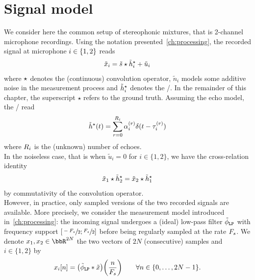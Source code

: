 \section{Signal model}
We consider here the common setup of stereophonic mixtures, that is 2-channel microphone recordings.
Using the notation presented~\cref{ch:processing}, the recorded signal at microphone $i\in\{1,2\}$ reads
\begin{equation}
    \label{eq:blaster:recordedSignal}
    \tilde{x}_i = \tilde{s} \star \tilde{h}_i^\star + \tilde{u}_i
\end{equation}
where $\star$ denotes the (continuous) convolution operator, $\tilde{n}_i$ models some additive noise in the measurement process and $\tilde{h}_i^\star$ denotes the \RIRdef/.
In the remainder of this chapter, the superscript $\star$ refers to the ground truth.
Assuming the echo model, the \RIRs/ read
\begin{equation}
    \label{eq:blaster:def_filter_star}
    \tilde{h}^\star(t) = \sum_{r=0}^{R_i} \alpha_i^{(r)} \delta(t - \tau_i^{(r)})
\end{equation}
where $R_i$ is the (unknown) number of echoes.
\\In the noiseless case, that is when $\tilde{u}_i = 0$ for $i\in\{1,2\}$, we have the cross-relation identity
\begin{equation} \label{eq:blaster:cross-relation}
    \tilde{x}_1 \star \tilde{h}_2^\star = \tilde{x}_2 \star \tilde{h}_1^\star
\end{equation}
by commutativity of the convolution operator.
\\However, in practice, only sampled versions of the two recorded signals are available.
More precisely, we consider the measurement model introduced in~\cref{ch:processing}:
the incoming signal undergoes a (ideal) low-pass filter $\lowpassfilter$ with frequency support $\kintervcc{\sfrac{-\Fs}{2}}{\sfrac{\Fs}{2}}$ before being regularly sampled at the rate $F_s$.
We denote $\disRecordedSignal_1,\disRecordedSignal_2\in\bbR^{2N}$ the two vectors of $2N$ (consecutive) samples and $i\in\{1, 2\}$ by
\begin{equation}
    \label{eq:blaster:measurement-process}
    \disRecordedSignal_i[n] =
    \kparen{\idealLowPassFilter \convDis \contRecordedSignal}\kparen{\frac{n}{\Fs}}
    \qquad
    \forall n \in\{0, \dots, 2N-1\}
    .
\end{equation}


